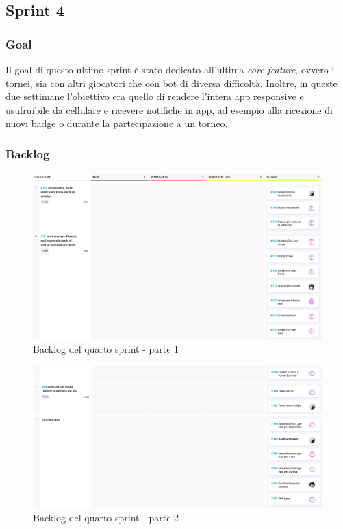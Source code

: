 \documentclass{article}
\begin{document}
\subsection{Sprint 4}

\subsubsection{Goal}
Il goal di questo ultimo sprint è stato dedicato all'ultima \textit{core feature}, ovvero i tornei, sia con altri giocatori che con bot di diversa difficoltà.
Inoltre, in queste due settimane l'obiettivo era quello di rendere l'intera app responsive e usufruibile da cellulare e ricevere
notifiche in app, ad esempio alla ricezione di nuovi badge o durante la partecipazione a un torneo.

\subsubsection{Backlog}
\begin{figure}[H]
    \centering
    \includegraphics[width=1\textwidth]{backlog4_1}
    \caption{Backlog del quarto sprint - parte 1}
    \label{fig:backlog4_1}
\end{figure}

\begin{figure}[H]
    \centering
    \includegraphics[width=1\textwidth]{backlog4_2}
    \caption{Backlog del quarto sprint - parte 2}
    \label{fig:backlog4_2}
\end{figure}
\end{document}
